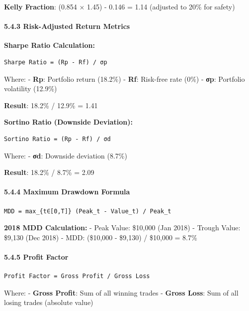 \textbf{Kelly Fraction}: (0.854 × 1.45) - 0.146 = 1.14 (adjusted to 20\%
for safety)

\paragraph{5.4.3 Risk-Adjusted Return
Metrics}\label{risk-adjusted-return-metrics}

\textbf{Sharpe Ratio Calculation:}

\begin{verbatim}
Sharpe Ratio = (Rp - Rf) / σp
\end{verbatim}

Where: - \textbf{Rp}: Portfolio return (18.2\%) - \textbf{Rf}: Risk-free
rate (0\%) - \textbf{σp}: Portfolio volatility (12.9\%)

\textbf{Result}: 18.2\% / 12.9\% = 1.41

\textbf{Sortino Ratio (Downside Deviation):}

\begin{verbatim}
Sortino Ratio = (Rp - Rf) / σd
\end{verbatim}

Where: - \textbf{σd}: Downside deviation (8.7\%)

\textbf{Result}: 18.2\% / 8.7\% = 2.09

\paragraph{5.4.4 Maximum Drawdown
Formula}\label{maximum-drawdown-formula}

\begin{verbatim}
MDD = max_{t∈[0,T]} (Peak_t - Value_t) / Peak_t
\end{verbatim}

\textbf{2018 MDD Calculation:} - Peak Value: \$10,000 (Jan 2018) -
Trough Value: \$9,130 (Dec 2018) - MDD: (\$10,000 - \$9,130) / \$10,000
= 8.7\%

\paragraph{5.4.5 Profit Factor}\label{profit-factor}

\begin{verbatim}
Profit Factor = Gross Profit / Gross Loss
\end{verbatim}

Where: - \textbf{Gross Profit}: Sum of all winning trades -
\textbf{Gross Loss}: Sum of all losing trades (absolute value)

